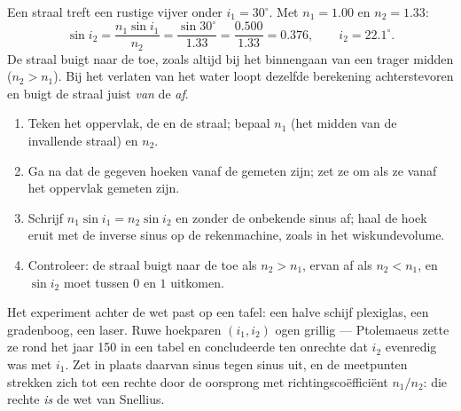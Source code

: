 \begin{example}\label{ex:g10:refraction:airwater}
Een straal treft een rustige vijver onder $i_1 = 30^\circ$. Met
$n_1 = 1.00$ en $n_2 = 1.33$:
\[
\sin i_2 = \frac{n_1 \sin i_1}{n_2} = \frac{\sin 30^\circ}{1.33}
= \frac{0.500}{1.33} = 0.376,
\qquad
i_2 = 22.1^\circ .
\]
De straal buigt naar de  toe, zoals altijd bij het binnengaan van
een trager midden ($n_2 > n_1$). Bij het verlaten van het water loopt
dezelfde berekening achterstevoren en buigt de straal juist \emph{van}
de  \emph{af}.
\end{example}

\begin{method}\label{met:g10:refraction:method}
\begin{enumerate}
  \item Teken het oppervlak, de  en de straal; bepaal $n_1$ (het
        midden van de invallende straal) en $n_2$.
  \item Ga na dat de gegeven hoeken vanaf de  gemeten zijn; zet ze
        om als ze vanaf het oppervlak gemeten zijn.
  \item Schrijf $n_1 \sin i_1 = n_2 \sin i_2$ en zonder de onbekende
        sinus af; haal de hoek eruit met de inverse sinus op de
        rekenmachine, zoals in het wiskundevolume.
  \item Controleer: de straal buigt naar de  toe als $n_2 > n_1$,
        ervan af als $n_2 < n_1$, en $\sin i_2$ moet tussen $0$ en $1$
        uitkomen.
\end{enumerate}
\end{method}

Het experiment achter de wet past op een tafel: een halve schijf
plexiglas, een gradenboog, een laser. Ruwe hoekparen $(i_1, i_2)$ ogen
grillig --- Ptolemaeus zette ze rond het jaar 150 in een tabel en
concludeerde ten onrechte dat $i_2$ evenredig was met $i_1$. Zet in
plaats daarvan sinus tegen sinus uit, en de meetpunten strekken zich tot
een rechte door de oorsprong met richtingscoëfficiënt $n_1/n_2$: die
rechte \emph{is} de wet van Snellius.

